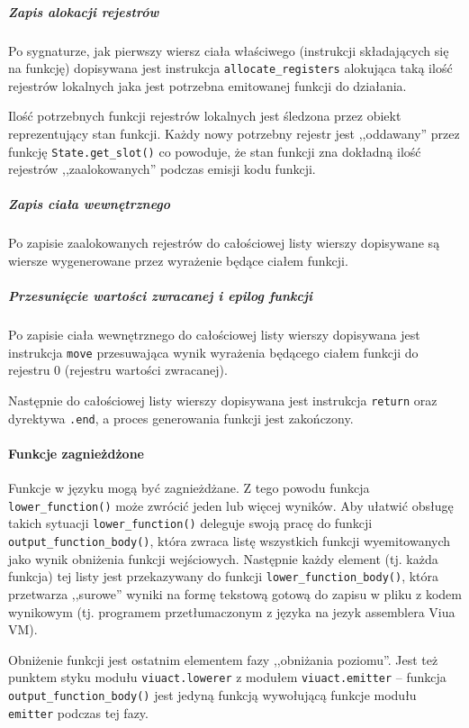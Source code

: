 \subparagraph{Zapis alokacji rejestrów}

Po sygnaturze, jak pierwszy wiersz ciała właściwego (instrukcji składających się
na funkcję) dopisywana jest instrukcja \texttt{allocate\_registers} alokująca
taką ilość rejestrów lokalnych jaka jest potrzebna emitowanej funkcji do
działania.

Ilość potrzebnych funkcji rejestrów lokalnych jest śledzona przez obiekt
reprezentujący stan funkcji. Każdy nowy potrzebny rejestr jest ,,oddawany''
przez funkcję \texttt{State.get\_slot()} co powoduje, że stan funkcji zna
dokładną ilość rejestrów ,,zaalokowanych'' podczas emisji kodu funkcji.

\subparagraph{Zapis ciała wewnętrznego}

Po zapisie zaalokowanych rejestrów do całościowej listy wierszy dopisywane są
wiersze wygenerowane przez wyrażenie będące ciałem funkcji.

\subparagraph{Przesunięcie wartości zwracanej i epilog funkcji}

Po zapisie ciała wewnętrznego do całościowej listy wierszy dopisywana jest
instrukcja \texttt{move} przesuwająca wynik wyrażenia będącego ciałem funkcji do
rejestru 0 (rejestru wartości zwracanej).

Następnie do całościowej listy wierszy dopisywana jest instrukcja \texttt{return}
oraz dyrektywa \texttt{.end}, a proces generowania funkcji jest zakończony.

\paragraph{Funkcje zagnieżdżone}

Funkcje w języku \ViuAct\phantom{} mogą być zagnieżdżane. Z tego powodu funkcja
\texttt{lower\_function()} może zwrócić jeden lub więcej wyników. Aby ułatwić
obsługę takich sytuacji \texttt{lower\_function()} deleguje swoją pracę do
funkcji \texttt{output\_function\_body()}, która zwraca listę wszystkich funkcji
wyemitowanych jako wynik obniżenia funkcji wejściowych. Następnie każdy element
(tj. każda funkcja) tej listy jest przekazywany do funkcji \texttt{lower\_function\_body()},
która przetwarza ,,surowe'' wyniki na formę tekstową gotową do zapisu w pliku z
kodem wynikowym (tj. programem przetłumaczonym z języka \ViuAct\phantom{} na
jezyk assemblera Viua VM).

\vspace{1em}

Obniżenie funkcji jest ostatnim elementem fazy ,,obniżania poziomu''. Jest też
punktem styku modułu \texttt{viuact.lowerer} z modułem \texttt{viuact.emitter}
-- funkcja \texttt{output\_function\_body()} jest jedyną funkcją wywołującą
funkcje modułu \texttt{emitter} podczas tej fazy.

